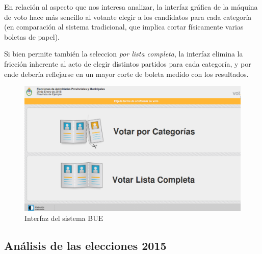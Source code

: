 \documentclass[12pt,a4paper]{article}
\begin{document}
En relación al aspecto que nos interesa analizar, la interfaz gráfica de la
máquina de voto hace más sencillo al votante elegir a los candidatos para cada
categoría (en comparación al sistema tradicional, que implica cortar físicamente
varias boletas de papel).

Si bien permite también la seleccion \emph{por lista completa}, la interfaz
elimina la fricción inherente al acto de elegir distintos partidos para cada
categoría, y por ende debería reflejarse en un mayor corte de boleta medido con
los resultados.

\begin{figure}[h]
\centering
    \includegraphics[width=\textwidth]{interfaz_bue}
\caption{Interfaz del sistema BUE}
\end{figure}

\subsection{Análisis de las elecciones 2015}
\end{document}
